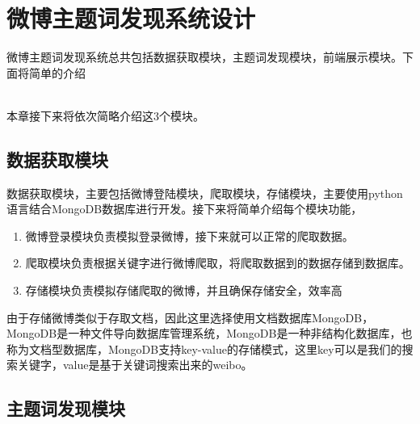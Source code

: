 \documentclass[master]{njuthesis}
\begin{document}
\section{微博主题词发现系统设计}

    微博主题词发现系统总共包括数据获取模块，主题词发现模块，前端展示模块。下面将简单的介绍\\
\\

本章接下来将依次简略介绍这3个模块。

\subsection{数据获取模块}
    
    数据获取模块，主要包括微博登陆模块，爬取模块，存储模块，主要使用python语言结合MongoDB数据库进行开发。接下来将简单介绍每个模块功能，
\begin{enumerate}
\item 微博登录模块负责模拟登录微博，接下来就可以正常的爬取数据。
\item 爬取模块负责根据关键字进行微博爬取，将爬取数据到的数据存储到数据库。
\item 存储模块负责模拟存储爬取的微博，并且确保存储安全，效率高
\end{enumerate}

    由于存储微博类似于存取文档，因此这里选择使用文档数据库MongoDB，MongoDB是一种文件导向数据库管理系统，MongoDB是一种非结构化数据库，也称为文档型数据库，MongoDB支持key-value的存储模式，这里key可以是我们的搜索关键字，value是基于关键词搜索出来的weibo。

\subsection{主题词发现模块}
\end{document}
